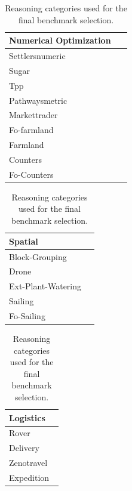 \begin{table}[H] 
    \centering
    \renewcommand{\arraystretch}{1.5}

    \begin{minipage}[t]{0.30\textwidth}
        \centering
        \begin{tabular}[t]{@{}>{\centering\arraybackslash}p{0.9\linewidth}@{}}
            \toprule
            \textbf{Numerical Optimization}\\
            \midrule
            Settlersnumeric\\
            Sugar\\
            Tpp\\
            Pathwaysmetric\\
            Markettrader\\
            Fo-farmland\\
            Farmland\\
            Counters\\
            Fo-Counters\\
            \bottomrule
        \end{tabular}
    \end{minipage}%
    \hfill%
    \begin{minipage}[t]{0.31\textwidth}
        \centering
        \begin{tabular}[t]{@{}>{\centering\arraybackslash}p{0.9\linewidth}@{}}
            \toprule
            \textbf{Spatial}\\
            \midrule
            Block-Grouping\\
            Drone\\
            Ext-Plant-Watering\\
            Sailing\\
            Fo-Sailing\\
            \bottomrule
        \end{tabular}
    \end{minipage}%
    \hfill%
    \begin{minipage}[t]{0.31\textwidth}
        \centering
        \begin{tabular}[t]{@{}>{\centering\arraybackslash}p{0.9\linewidth}@{}}
            \toprule
            \textbf{Logistics}\\
            \midrule
            Rover\\
            Delivery\\
            Zenotravel\\
            Expedition\\
            \bottomrule
        \end{tabular}
    \end{minipage}

    \vspace{0.4cm}
    \caption{Reasoning categories used for the final benchmark selection.}
    \label{tab:selected-reasoning-categories}
\end{table}


